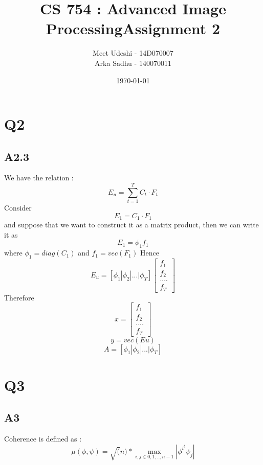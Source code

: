 \documentclass{article}
\title{CS 754 : Advanced Image ProcessingAssignment 2}
\author{Meet Udeshi - 14D070007\\
  Arka Sadhu - 140070011\\
}
\date{\today}
\begin{document}
\maketitle

\section*{Q2}
\subsection*{A2.3}
We have the relation : $$E_u = \sum_{t=1}^TC_t \cdot F_t$$
Consider $$E_1 = C_1 \cdot F_1$$ and suppose that we want to construct it as a matrix product, then we can write it as
$$E_1 = \phi_1 f_1$$ where $\phi_1 = diag(C_1)$ and $f_1 = vec(F_1)$
Hence $$E_u = [\phi_1 | \phi_2 |...| \phi_T] \begin{bmatrix}
  f_1\\ f_2 \\....\\ f_T \end{bmatrix} $$
Therefore $$x = \begin{bmatrix}
  f_1\\ f_2 \\....\\ f_T \end{bmatrix}$$
$$ y = vec(Eu)$$
$$A = [\phi_1 | \phi_2 |...| \phi_T]$$




\section*{Q3}
\subsection*{A3}
Coherence is defined as : $$\mu(\phi,\psi) = \sqrt(n)*\max_{i,j \in {0,1,..,n-1}} |\phi^{i^{t}}\psi_j|$$
\end{document}
